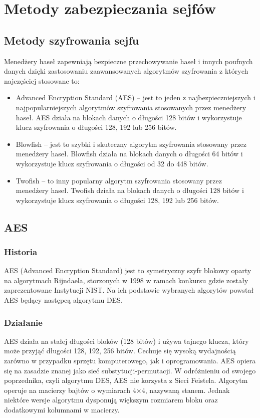 \section{Metody zabezpieczania sejfów}

\subsection{Metody szyfrowania sejfu}

Menedżery haseł zapewniają bezpieczne przechowywanie haseł i innych poufnych danych dzięki zastosowaniu zaawansowanych algorytmów szyfrowania z których najczęściej stosowane to:

\begin{itemize}
    \item Advanced Encryption Standard (AES) – jest to jeden z najbezpieczniejszych i najpopularniejszych algorytmów szyfrowania stosowanych przez menedżery haseł. AES działa na blokach danych o długości 128 bitów i wykorzystuje klucz szyfrowania o długości 128, 192 lub 256 bitów.
    \item Blowfish – jest to szybki i skuteczny algorytm szyfrowania stosowany przez menedżery haseł. Blowfish działa na blokach danych o długości 64 bitów i wykorzystuje klucz szyfrowania o długości od 32 do 448 bitów.
    \item Twofish – to inny popularny algorytm szyfrowania stosowany przez menedżery haseł. Twofish działa na blokach danych o długości 128 bitów i wykorzystuje klucz szyfrowania o długości 128, 192 lub 256 bitów.
  \end{itemize}

\subsection{AES}
\subsubsection{Historia}
AES (Advanced Encryption Standard) jest to symetryczny szyfr blokowy oparty na algorytmach Rijndaela, storzonych w 1998 w ramach konkursu gdzie zostały zaprezentowane Instytucji NIST. Na ich podstawie wybranych algorytów powstał AES będący następcą algorytmu DES.
\subsubsection{Działanie}
AES działa na stałej długości bloków (128 bitów) i używa tajnego klucza, który może przyjąć długości 128, 192, 256 bitów. Cechuje się wysoką wydajnością zarówno w przypadku sprzętu komputerowego, jak i oprogramowania. AES opiera się na zasadzie znanej jako sieć substytucji-permutacji. W odróżnieniu od swojego poprzednika, czyli algorytmu DES, AES nie korzysta z Sieci Feistela. Algorytm operuje na macierzy bajtów o wymiarach 4×4, nazywaną stanem. Jednak niektóre wersje algorytmu dysponują większym rozmiarem bloku oraz dodatkowymi kolumnami w macierzy.

